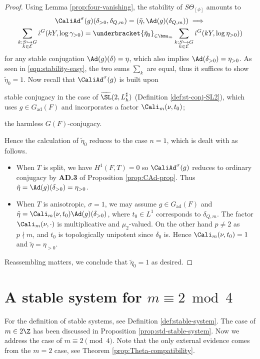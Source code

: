 \documentclass[a4paper,10pt]{article}
\begin{document}
\begin{proof}
	Using Lemma \ref{prop:four-vanishing}, the stability of $S\Theta_{[\phi]}$ amounts to
	\begin{multline*}
		\CaliAd^\sigma(g)(\delta_{>0}, \delta_{Q,m}) = \left(\tilde{\eta}, \Ad(g)(\delta_{Q,m})\right) \implies \\
		\sum_{\substack{k: S \hookrightarrow G \\ k \in \mathcal{E}}} \hat{\iota}^G(kY, \log \gamma_{>0}) = \underbracket{ \tilde{\eta}_0 }_{\in \bmu_m} \sum_{\substack{k: S \hookrightarrow G \\ k \in \mathcal{E}}} \hat{\iota}^G (kY, \log \eta_{>0}))
	\end{multline*}
	for any stable conjugation $\Ad(g)(\delta) = \eta$, which also implies $\Ad(\delta_{>0}) = \eta_{>0}$. As seen in \eqref{eqn:stability-easy}, the two sums $\sum_k$ are equal, thus it suffices to show $\tilde{\eta}_0 = 1$. Now recall that $\CaliAd^\sigma(g)$ is built upon
	\begin{compactitem}
		\item stable conjugacy in the case of $\widetilde{\SL}(2, L_h^\sharp)$ (Definition \ref{def:st-conj-SL2}), which uses $g \in G_\text{ad}(F)$ and incorporates a factor $\Cali_m(\nu, t_0)$;
		\item the harmless $G(F)$-conjugacy.
	\end{compactitem}
	Hence the calculation of $\tilde{\eta}_0$ reduces to the case $n=1$, which is dealt with as follows.
	\begin{itemize}
		\item When $T$ is split, we have $H^1(F,T)=0$ so $\CaliAd^\sigma(g)$ reduces to ordinary conjugacy by \textbf{AD.3} of Proposition \ref{prop:CAd-prop}. Thus $\tilde{\eta} = \Ad(g)(\delta_{>0}) = \eta_{>0}$.
		\item When $T$ is anisotropic, $\sigma=1$, we may assume $g \in G_\text{ad}(F)$ and $\tilde{\eta} = \Cali_m(\nu, t_0) \Ad(g)(\delta_{>0})$, where $t_0 \in L^1$ corresponds to $\delta_{Q,m}$. The factor $\Cali_m(\nu, \cdot)$ is multiplicative and $\mu_2$-valued. On the other hand $p \neq 2$ as $p \nmid m$, and $t_0$ is topologically unipotent since $\delta_0$ is. Hence $\Cali_m(\nu, t_0) = 1$ and $\tilde{\eta} = \eta_{>0}$.
	\end{itemize}
	Reassembling matters, we conclude that $\tilde{\eta}_0 = 1$ as desired.
\end{proof}

\section{A stable system for \texorpdfstring{$m \equiv 2 \bmod 4$}{m congruent 2 mod 4}}\label{sec:stable-system}
For the definition of stable systems, see Definition \ref{def:stable-system}. The case of $m \in 2\Z$ has been discussed in Proposition \ref{prop:std-stable-system}. Now we address the case of $m \equiv 2 \pmod 4$. Note that the only external evidence comes from the $m=2$ case, see Theorem \ref{prop:Theta-compatibility}.
\end{document}
